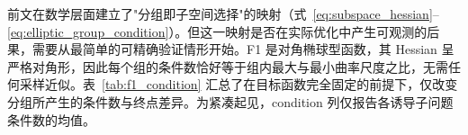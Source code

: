前文在数学层面建立了"分组即子空间选择"的映射（式~\eqref{eq:subspace_hessian}--\eqref{eq:elliptic_group_condition}）。但这一映射是否在实际优化中产生可观测的后果，需要从最简单的可精确验证情形开始。F1 是对角椭球型函数，其 Hessian 呈严格对角形，因此每个组的条件数恰好等于组内最大与最小曲率尺度之比，无需任何采样近似。表~\ref{tab:f1_condition} 汇总了在目标函数完全固定的前提下，仅改变分组所产生的条件数与终点差异。为紧凑起见，condition 列仅报告各诱导子问题条件数的均值。
